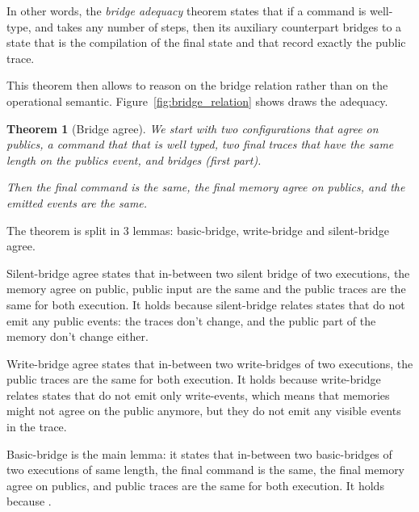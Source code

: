\documentclass[10pt]{article}
\newtheorem{theorem}{Theorem}
\begin{document}
In other words, the \emph{bridge adequacy} theorem states that if a command is well-type, and takes
any number of steps, then its auxiliary counterpart bridges to a state that is the compilation of
the final state and that record exactly the public trace.

This theorem then allows to reason on the bridge relation rather than on the operational semantic.
Figure~\ref{fig:bridge_relation} shows draws the adequacy.




\begin{theorem}[Bridge agree]
  We start with two configurations that agree on publics, a command that that is well typed, two
  final traces that have the same length on the publics event, and bridges (first part).

  Then the final command is the same, the final memory agree on publics, and the emitted events are
  the same.
\end{theorem}


The theorem is split in 3 lemmas: basic-bridge, write-bridge and silent-bridge agree.

Silent-bridge agree states that in-between two silent bridge of two executions,
the memory agree on public, public input are the same and the public
traces are the same for both execution. It holds because silent-bridge relates states that do not
emit any public events: the traces don't change, and the public part of the memory don't change
either.

Write-bridge agree states that in-between two write-bridges of two executions,
the public traces are the same for both execution. It holds because write-bridge relates states that
do not emit only write-events, which means that memories might not agree on the public anymore, but
they do not emit any visible events in the trace.

Basic-bridge is the main lemma: it states that in-between two basic-bridges of two executions of
same length, the final command is the same, the final memory agree on publics, and
public traces are the same for both execution.
It holds because .
\end{document}
